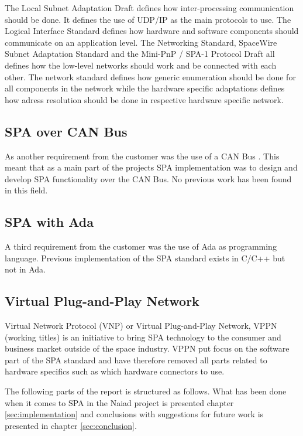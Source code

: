 The Local Subnet Adaptation Draft defines how inter-processing communication
should be done. It defines the use of UDP/IP as the main protocols to use. The
Logical Interface Standard defines how hardware and software components should
communicate on an application level. The Networking Standard, SpaceWire Subnet
Adaptation Standard and the Mini-PnP / SPA-1 Protocol Draft all defines how the
low-level networks should work and be connected with each other. The network
standard defines how generic enumeration should be done for all components in
the network while the hardware specific adaptations defines how adress
resolution should be done in respective hardware specific network.

\subsection{SPA over CAN Bus}
As another requirement from the customer was the use of a CAN Bus
\cite{standard:can_bus}. This meant that as a main part of the projects
SPA implementation was to design and develop SPA functionality over the CAN
Bus. No previous work has been found in this field.

\subsection{SPA with Ada}
A third requirement from the customer was the use of Ada as programming
language. Previous implementation of the SPA standard exists in C/C++ but not
in Ada.

\subsection{Virtual Plug-and-Play Network}
Virtual Network Protocol (VNP) \cite{web:vnp} or Virtual Plug-and-Play
Network, VPPN (working titles) is an initiative to bring SPA technology to
the consumer and business market outside of the space industry. VPPN put focus
on the software part of the SPA standard and have therefore removed all parts
related to hardware specifics such as which hardware connectors to use.

The following parts of the report is structured as follows. What has been done
when it comes to SPA in the Naiad project is presented chapter
\ref{sec:implementation} and conclusions with suggestions for future work is
presented in chapter \ref{sec:conclusion}.
